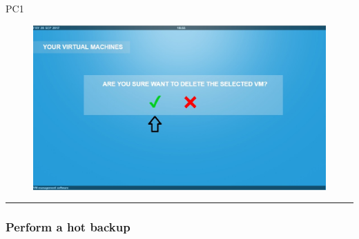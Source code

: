\begin{lyxlist}{PC1}
\begin{figure}[H]
\centering
\includegraphics[width=170mm]{images/deleteVM5.eps}
\caption{\label{overflow}}
\end{figure}

\end{lyxlist}
\hrule
\vspace{0.5cm}







\subsubsection{Perform a hot backup}

